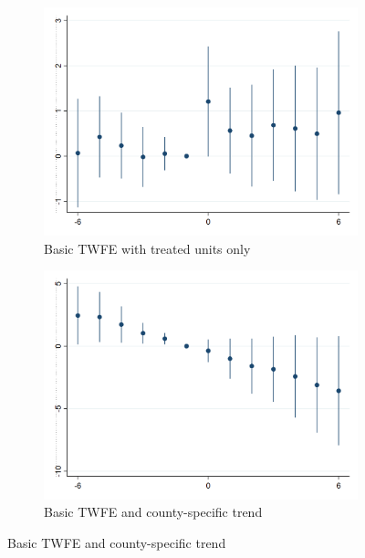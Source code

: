     \begin{figure}[h!] \centering
        \caption{Dynamic effects around selected minimum wage events: housing prices}
        \label{fig:event_study_main}
        \begin{subfigure}{0.5\textwidth} \centering
            \includegraphics[width=0.95\linewidth]{analysis/event_study/output/last_listingpsqft_sfcc_w6.png}
            \caption{Basic TWFE with treated units only} \label{fig:event_study_treated}
        \end{subfigure}%
        \begin{subfigure}{0.5\textwidth} \centering
            \includegraphics[width=0.95\linewidth]{analysis/event_study/output/last_listingpsqft_sfccw6_county-trend.png}
            \caption{Basic TWFE and county-specific trend} \label{fig:event_study_treated_county-trends}

\end{subfigure}
\end{figure}

